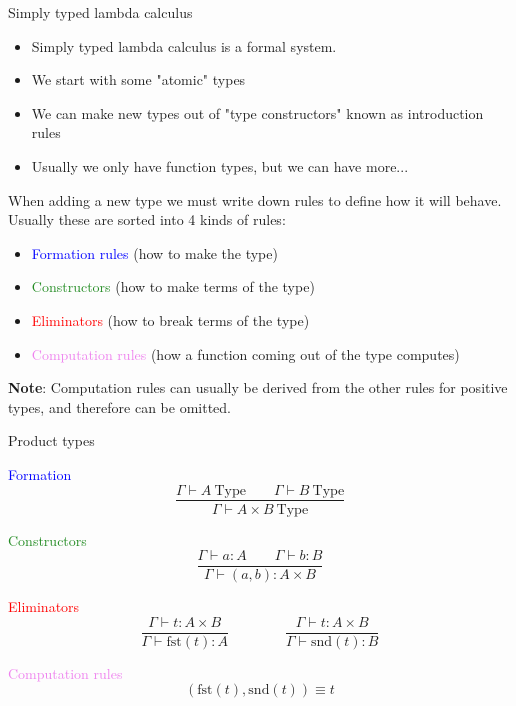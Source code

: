 \documentclass[usenames,dvipsnames]{beamer}
\newcommand{\blu}[1]{\textcolor{blue}{#1}}
\newcommand{\gre}[1]{\textcolor{ForestGreen}{#1}}
\newcommand{\red}[1]{\textcolor{red}{#1}}
\newcommand{\yel}[1]{\textcolor{violet}{#1}}
\begin{document}
    \begin{frame}{Simply typed lambda calculus}
        \begin{itemize}
            \item Simply typed lambda calculus is a formal system.
            \item We start with some "atomic" types
            \item We can make new types out of "type constructors" known as introduction rules
            \item Usually we only have function types, but we can have more...
        \end{itemize}
        When adding a new type we must write down rules to define how it will behave.
        Usually these are sorted into 4 kinds of rules:
        \begin{itemize}
            \item \blu{Formation rules} (how to make the type)
            \item \gre{Constructors} (how to make terms of the type)
            \item \red{Eliminators} (how to break terms of the type)
            \item \yel{Computation rules} (how a function coming out of the type computes)
        \end{itemize}
        \textbf{Note}: Computation rules can usually be derived from the other rules for positive types, and therefore can be omitted.
    \end{frame}

    \begin{frame}{Product types}
        \begin{block}{\blu{Formation}}
            $$\frac{\Gamma \vdash A\ \text{Type}\qquad \Gamma \vdash B\ \text{Type} }{\Gamma \vdash A \times B\ \text{Type}}$$
        \end{block}
        
        \begin{block}{\gre{Constructors}}
            $$\frac{\Gamma \vdash a : A\qquad \Gamma \vdash b : B}{\Gamma\vdash (a,b) : A\times B}$$
        \end{block}
        
        \begin{block}{\red{Eliminators}}
            $$\frac{\Gamma \vdash t : A \times B}{\Gamma\vdash\text{fst}(t) : A} \qquad\qquad
              \frac{\Gamma \vdash t : A \times B}{\Gamma\vdash\text{snd}(t) : B}$$
        \end{block}
        
        \begin{block}{\yel{Computation rules}}
            $$(\text{fst}(t), \text{snd}(t)) \equiv t$$
        \end{block}
    \end{frame}    
    
\end{document}
